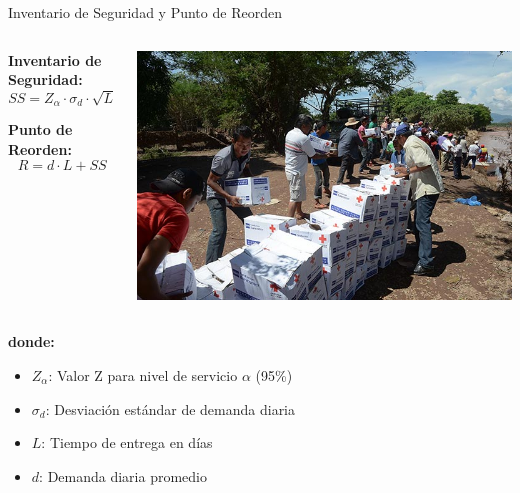 \documentclass[
  ignorenonframetext,
]{beamer}
\providecommand{\tightlist}{%
  \setlength{\itemsep}{0pt}\setlength{\parskip}{0pt}}
\begin{document}
\begin{frame}{Inventario de Seguridad y Punto de Reorden}
\label{inventario-de-seguridad-y-punto-de-reorden}
\begin{columns}[T]
\begin{column}{0.5\linewidth}
\textbf{Inventario de Seguridad:}
\[SS = Z_{\alpha} \cdot \sigma_d \cdot \sqrt{L}\]

\textbf{Punto de Reorden:} \[R = d \cdot L + SS\]
\end{column}

\begin{column}{0.5\linewidth}
\includegraphics[width=0.85\linewidth,height=\textheight,keepaspectratio]{ayu.png}
\end{column}
\end{columns}

\textbf{donde:}

\begin{itemize}
\tightlist
\item
  \(Z_{\alpha}\): Valor Z para nivel de servicio \(\alpha\) (95\%)
\item
  \(\sigma_d\): Desviación estándar de demanda diaria
\item
  \(L\): Tiempo de entrega en días
\item
  \(d\): Demanda diaria promedio
\end{itemize}
\end{frame}
\end{document}
